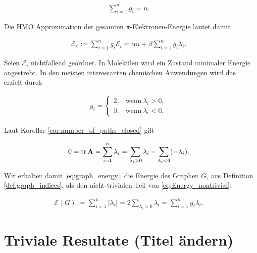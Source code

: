         \begin{align*}
            \sum_{i=1}^n g_i = n.
        \end{align*}

        Die HMO Approximation der gesamten $\pi$-Elektronen-Energie lautet damit

        \begin{align} \label{eq:Energy_nontrivial}
            \mathcal E_\pi
            :=
            \sum_{i=1}^n g_i \mathcal E_i
            =
            \alpha n + \beta \sum_{i=1}^n g_i \lambda_i.
        \end{align}

        Seien $\mathcal E_i$ nichtfallend geordnet.
        In Molekülen wird ein Zustand minimaler Energie angestrebt.
        In den meisten interessanten chemischen Anwendungen wird das erzielt durch

        \begin{align*}
            g_i
            =
            \begin{cases}
                2, & \text{wenn} ~ \lambda_i > 0, \\
                0, & \text{wenn} ~ \lambda_i < 0.
            \end{cases}
        \end{align*}

        Laut Korollar \ref{cor:number_of_paths_closed} gilt

        \begin{align*}
            0
            =
            \operatorname{tr} \mathbf A
            =
            \sum_{i=1}^n \lambda_i
            =
            \sum_{\lambda_i > 0} \lambda_i
            -
            \sum_{\lambda_i < 0} (-\lambda_i).
        \end{align*}

        Wir erhalten damit \eqref{eq:graph_energy}, die Energie des Graphen $G$, aus Definition \ref{def:graph_indices}, als den nicht-trivialen Teil von \eqref{eq:Energy_nontrivial}:

        \begin{align*}
            \mathcal E(G)
            :=
            \sum_{i=1}^n |\lambda_i|
            =
            2 \sum_{\lambda_i > 0} \lambda_i
            =
            \sum_{i=1}^n g_i \lambda_i.
        \end{align*}

        \section{Triviale Resultate (Titel ändern)}

